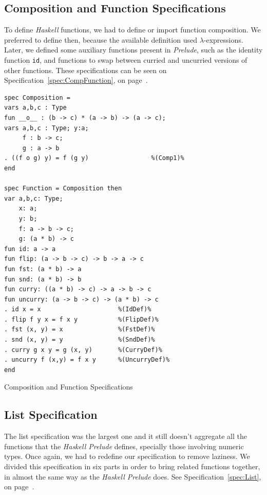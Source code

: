 \documentclass[12pt,twoside]{article}
\numberwithin{spec}{subsection}
\numberwithin{proof}{subsection}
\numberwithin{figure}{subsection}
\numberwithin{code}{subsection}
\newcommand{\citeSpec}[1]{Specification~\ref{#1}, on page~\pageref{#1}}
\begin{document}
\clearpage

\subsection{Composition and Function Specifications}

To define \textit{Haskell} functions, we had to define or import function composition. We preferred to define then, because the available definition used $\lambda$-expressions. Later, we defined some auxiliary functions present in \textit{Prelude}, such as the identity function \verb.id., and functions to swap between curried and uncurried versions of other functions. These specifications can be seen on \citeSpec{spec:CompFunction}.

\begin{spec}\capstart
\begin{verbatim}
spec Composition =
vars a,b,c : Type
fun __o__ : (b -> c) * (a -> b) -> (a -> c);
vars a,b,c : Type; y:a;
     f : b -> c; 
     g : a -> b
. ((f o g) y) = f (g y)                 %(Comp1)%
end

spec Function = Composition then
var a,b,c: Type;
    x: a;
    y: b;   
    f: a -> b -> c;
    g: (a * b) -> c
fun id: a -> a
fun flip: (a -> b -> c) -> b -> a -> c
fun fst: (a * b) -> a
fun snd: (a * b) -> b
fun curry: ((a * b) -> c) -> a -> b -> c
fun uncurry: (a -> b -> c) -> (a * b) -> c
. id x = x                     %(IdDef)%
. flip f y x = f x y           %(FlipDef)%
. fst (x, y) = x               %(FstDef)%
. snd (x, y) = y               %(SndDef)%
. curry g x y = g (x, y)       %(CurryDef)%
. uncurry f (x,y) = f x y      %(UncurryDef)%
end
\end{verbatim}
\caption{Composition and Function Specifications}
\label{spec:CompFunction}
\end{spec}

\clearpage

\subsection{List Specification}
The list specification was the largest one and it still doesn't aggregate all the functions that the \textit{Haskell Prelude} defines, specially those involving numeric types. Once again, we had to redefine our specification to remove laziness. We divided this specification in six parts in order to bring related functions together, in almost the same way as the \textit{Haskell Prelude} does. See \citeSpec{spec:List}.
\end{document}
